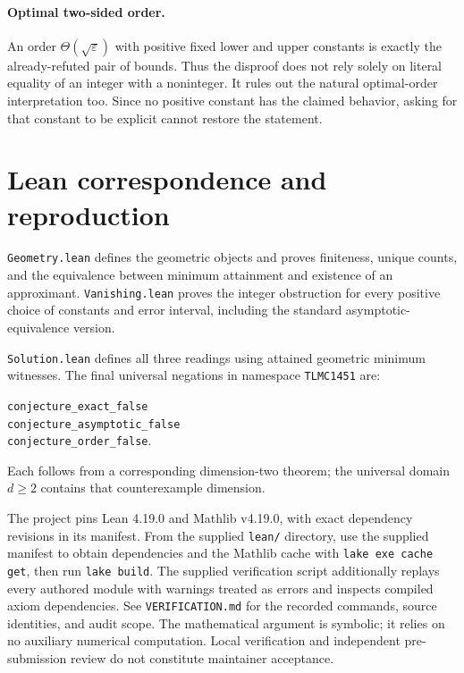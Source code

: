 \documentclass[11pt,letterpaper]{article}
\newcommand{\code}[1]{\texttt{\small #1}}
\begin{document}
\paragraph{Optimal two-sided order.}
An order $\Theta(\sqrt\varepsilon)$ with positive fixed lower and upper
constants is exactly the already-refuted pair of bounds. Thus the
disproof does not rely solely on literal equality of an integer with a
noninteger. It rules out the natural optimal-order interpretation too.
Since no positive constant has the claimed behavior, asking for that
constant to be explicit cannot restore the statement.

\section{Lean correspondence and reproduction}
\code{Geometry.lean} defines the geometric objects and proves finiteness,
unique counts, and the equivalence between minimum attainment and
existence of an approximant. \code{Vanishing.lean} proves the integer
obstruction for every positive choice of constants and error interval,
including the standard asymptotic-equivalence version.

\code{Solution.lean} defines all three readings using attained geometric
minimum witnesses. The final universal negations in namespace
\code{TLMC1451} are:
\begin{flushleft}
\code{conjecture\_exact\_false}\\
\code{conjecture\_asymptotic\_false}\\
\code{conjecture\_order\_false}.
\end{flushleft}
Each follows from a corresponding dimension-two theorem; the universal
domain $d\geq2$ contains that counterexample dimension.

The project pins Lean 4.19.0 and Mathlib v4.19.0, with exact dependency
revisions in its manifest. From the supplied \code{lean/} directory,
use the supplied manifest to obtain dependencies and the Mathlib cache
with \code{lake exe cache get}, then run \code{lake build}.
The supplied verification script additionally replays every authored
module with warnings treated as errors and inspects compiled axiom
dependencies. See \code{VERIFICATION.md} for the recorded commands,
source identities, and audit scope. The mathematical argument is
symbolic; it relies on no auxiliary numerical computation. Local
verification and independent pre-submission review do not constitute
maintainer acceptance.
\end{document}
